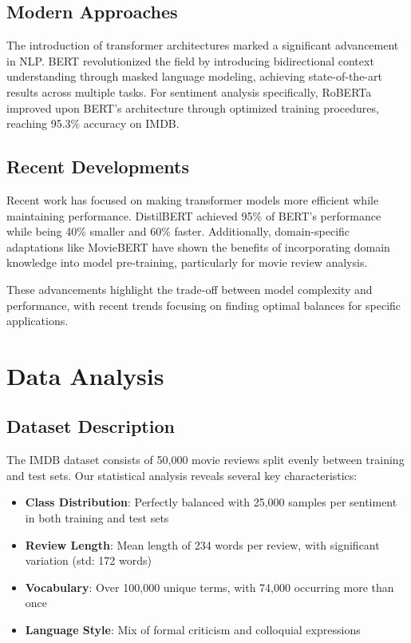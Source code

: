 \documentclass[numbers,nonatbib]{article}
\begin{document}
\subsection{Modern Approaches}
The introduction of transformer architectures marked a significant advancement in NLP. BERT \cite{devlin2018bert} revolutionized the field by introducing bidirectional context understanding through masked language modeling, achieving state-of-the-art results across multiple tasks. For sentiment analysis specifically, RoBERTa \cite{liu2019roberta} improved upon BERT's architecture through optimized training procedures, reaching 95.3\% accuracy on IMDB.

\subsection{Recent Developments}
Recent work has focused on making transformer models more efficient while maintaining performance. DistilBERT \cite{sanh2019distilbert} achieved 95\% of BERT's performance while being 40\% smaller and 60\% faster. Additionally, domain-specific adaptations like MovieBERT \cite{li2020moviebert} have shown the benefits of incorporating domain knowledge into model pre-training, particularly for movie review analysis.

These advancements highlight the trade-off between model complexity and performance, with recent trends focusing on finding optimal balances for specific applications.

\section{Data Analysis}
\subsection{Dataset Description}
The IMDB dataset consists of 50,000 movie reviews split evenly between training and test sets. Our statistical analysis reveals several key characteristics:

\begin{itemize}
    \item \textbf{Class Distribution}: Perfectly balanced with 25,000 samples per sentiment in both training and test sets
    \item \textbf{Review Length}: Mean length of 234 words per review, with significant variation (std: 172 words)
    \item \textbf{Vocabulary}: Over 100,000 unique terms, with 74,000 occurring more than once
    \item \textbf{Language Style}: Mix of formal criticism and colloquial expressions
\end{itemize}
\end{document}
